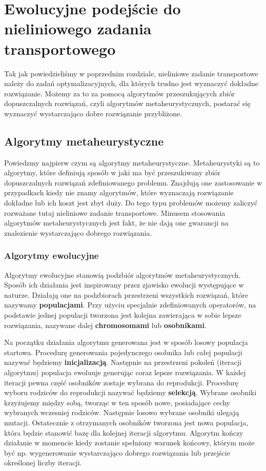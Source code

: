 \chapter{Ewolucyjne podejście do nieliniowego zadania transportowego}
\thispagestyle{chapterBeginStyle}

Tak jak powiedzieliśmy w poprzednim rozdziale, nieliniowe zadanie transportowe należy do zadań optymalizacyjnych, dla których trudno jest 
wyznaczyć dokładne rozwiązanie. Możemy za to za pomocą algorytmów przeszukujących zbiór dopuszczalnych rozwiązań, czyli algorytmów metaheurystycznych, 
postarać się wyznaczyć wystarczająco dobre rozwiązanie przybliżone. 

\section{Algorytmy metaheurystyczne}

Powiedzmy najpierw czym są algorytmy metaheurystyczne. Metaheurystyki są to algorytmy, które definiują sposób w jaki ma być przeszukiwany zbiór 
dopuszczalnych rozwiązań zdefiniowanego problemu. Znajdują one zastosowanie w przypadkach kiedy nie znamy algorytmów, które wyznaczają rozwiązanie 
dokładne lub ich koszt jest zbyt duży. Do tego typu problemów możemy zaliczyć rozważane tutaj nieliniowe zadanie transportowe. Minusem 
stosowania algorytmów metaheurystycznych jest fakt, że nie dają one gwarancji na znalezienie wystarczająco dobrego rozwiązania.

\subsection{Algorytmy ewolucyjne}
Algorytmy ewolucyjne stanowią podzbiór algorytmów metaheurystycznych. Sposób ich działania jest inspirowany przez zjawisko ewolucji występujące 
w naturze. Działają one na podzbiorach przestrzeni wszystkich rozwiązań, które nazywamy \textbf{populacjami}. Przy użyciu specjalnie zdefiniowanych 
operatorów, na podstawie jednej populacji tworzona jest kolejna zawierająca w sobie lepsze rozwiązania, nazywane dalej \textbf{chromosomami} 
lub \textbf{osobnikami}.

Na początku działania algorytmu generowana jest w sposób losowy populacja startowa. Procedurę generowania pojedynczego osobnika lub 
całej populacji nazywać będziemy \textbf{inicjalizacją}. Następnie na przestrzeni pokoleń (iteracji algorytmu) 
populacja ewoluuje generując coraz lepsze rozwiązania. W każdej iteracji pewna część osobników zostaje wybrana do reprodukcji. Procedurę wyboru 
rodziców do reprodukcji nazywać będziemy \textbf{selekcją}. Wybrane osobniki krzyżujemy między sobą, tworząc w ten sposób nowe, 
posiadające cechy wybranych wczesniej rodziców. Następnie losowo wybrane osobniki ulegają mutacji. 
Ostatecznie z otrzymanych osobników tworzona jest nowa populacja, która będzie stanowić bazę dla kolejnej iteracji algorytmu. Algorytm kończy 
działanie w momencie kiedy zostanie spełniony warunek końcowy, którym może być np. wygenerowanie wystarczająco dobrego rozwiązania lub 
przejście określonej liczby iteracji.

